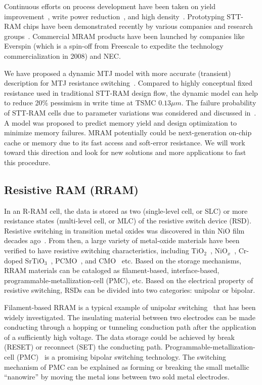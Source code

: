 Continuous efforts on process development have been taken on yield improvement~\cite{Miura07}, write power reduction~\cite{Durlam03}, and high density~\cite{Lou08}. Prototyping STT-RAM chips have been demonstrated recently by various companies and research groups~\cite{Hosomi05,Kawahara07,Nebashi09,Motoyoshi04,Andre05,Kawahara08}. Commercial MRAM products have been launched by companies like Everspin (which is a spin-off from Freescale to expedite the technology commercialization in 2008) and NEC.

We have proposed a dynamic MTJ model with more accurate (transient) description for MTJ resistance switching~\cite{Chen08}. Compared to highly conceptual fixed resistance used in traditional STT-RAM design flow, the dynamic model can help to reduce 20\% pessimism in write time at TSMC $0.13{\mu}m$. The failure probability of STT-RAM cells due to parameter variations was considered and discussed in~\cite{Li09}. A model was proposed to predict memory yield and design optimization to minimize memory failures. MRAM potentially could be next-generation on-chip cache or memory due to its fast access and soft-error resistance. We will work toward this direction and look for new solutions and more applications to fast this procedure.

\subsection{Resistive RAM (RRAM)}
In an R-RAM cell, the data is stored as two (single-level cell, or SLC) or more resistance states (multi-level cell, or MLC) of the resistive switch device (RSD). Resistive switching in transition metal oxides was discovered in thin NiO film decades ago~\cite{Gibbons64}. From then, a large variety of metal-oxide materials have been verified to have resistive switching characteristics, including TiO$_2$~\cite{Fujimoto06}, NiO$_x$~\cite{Jung07}, Cr-doped SrTiO$_3$~\cite{Janousch07}, PCMO~\cite{Liu00}, and CMO~\cite{Hsu07} etc. Based on the storage mechanisms, RRAM materials can be cataloged as filament-based, interface-based, programmable-metallization-cell (PMC), etc. Based on the electrical property of resistive switching, RSDs can be divided into two categories: unipolar or bipolar.

Filament-based RRAM is a typical example of unipolar switching~\cite{Inoue} that has been widely investigated. The insulating material between two electrodes can be made conducting through a hopping or tunneling conduction path after the application of a sufficiently high voltage. %
The data storage could be achieved by break (RESET) or reconnect (SET) the conducting path. Programmable-metallization-cell (PMC)~\cite{Kozicki05} is a promising bipolar switching technology. The switching mechanism of PMC can be explained as forming or breaking the small metallic ``nanowire'' by moving the  metal ions between two sold metal electrodes.

